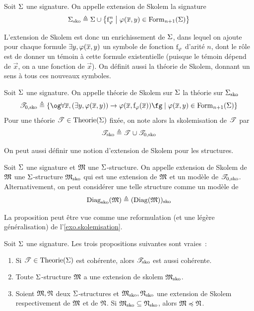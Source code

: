 \begin{definition}
  Soit $\Sigma$ une signature. On appelle extension de Skolem la signature
  \[\Sigma_{\operatorname{sko}} \triangleq
  \Sigma \cup
  \left\{ \mathrm{f}_{\varphi}^{n} \;\middle\vert\; \varphi(\overline{x},y)\in\operatorname{Form}_{n+1}(\Sigma) \right\}\]
\end{definition}

L'extension de Skolem est donc un enrichissement de $\Sigma$, dans lequel on
ajoute pour chaque formule $\exists y,\varphi(\overline{x},y)$ un symbole de fonction
$\mathrm{f}_{\varphi}$ d'arité $n$, dont le rôle est de donner un témoin à cette
formule existentielle (puisque le témoin dépend de $\vec x$, on a une fonction
de $\vec x$).
On définit aussi la théorie de Skolem, donnant un sens à tous ces
nouveaux symboles.

\begin{definition}
  Soit $\Sigma$ une signature. On appelle théorie de Skolem sur $\Sigma$ la
  théorie sur $\Sigma_{\operatorname{sko}}$
  \[\varT_{0,\sko} \defeq
  \compr{\ogM \forall \vec x,
    (\exists y, \varFF(\vec x,y))\to \varFF(\vec x,\symbF_{\varFF}(\vec x))\fgM}
        {\varFF(\vec x,y)\in\Formula_{n+1}(\Sign)}
  \]
  Pour une théorie $\mathscr T\in\operatorname{Theorie}(\Sigma)$ fixée, on note alors la
  skolemisation de $\mathscr T$ par
  \[\mathscr T_{\operatorname{sko}} \triangleq \mathscr T\cup\mathscr T_{0,\operatorname{sko}}\]
\end{definition}

On peut aussi définir une notion d'extension de Skolem pour les structures.

\begin{definition}
  Soit $\Sigma$ une signature et $\mathfrak{M}$ une $\Sigma$-structure. On appelle
  extension de Skolem de $\mathfrak{M}$ une $\Sigma$-structure $\mathfrak{M}_{\operatorname{sko}}$ qui
  est une extension de $\mathfrak{M}$ et un modèle de $\mathscr T_{0,\operatorname{sko}}$.
  Alternativement, on peut considérer une telle structure comme un modèle de
  \[\operatorname{Diag}_{\operatorname{sko}}(\mathfrak{M})\triangleq (\operatorname{Diag}(\mathfrak{M}))_{\operatorname{sko}}\]
\end{definition}

La proposition peut être vue comme une reformulation (et une légère
généralisation) de l'\cref{exo.skolemisation}.

\begin{proposition}\label{prop.skolemisation}
  Soit $\Sigma$ une signature. Les trois propositions suivantes sont vraies~:
  \begin{enumerate}[label=(\roman*)]
  \item Si $\mathscr T\in\operatorname{Theorie}(\Sigma)$ est cohérente, alors $\mathscr T_{\operatorname{sko}}$ est
    aussi cohérente.
  \item Toute $\Sigma$-structure $\mathfrak{M}$ a une extension de skolem
    $\mathfrak{M}_{\operatorname{sko}}$.
  \item Soient $\mathfrak{M},\mathfrak{N}$ deux $\Sigma$-structures et
    $\mathfrak{M}_{\operatorname{sko}},\mathfrak{N}_{\operatorname{sko}}$ une extension de Skolem respectivement de
    $\mathfrak{M}$ et de $\mathfrak{N}$. Si $\mathfrak{M}_{\operatorname{sko}}\subseteq\mathfrak{N}_{\operatorname{sko}}$, alors
    $\mathfrak{M}\preccurlyeq\mathfrak{N}$.
  \end{enumerate}
\end{proposition}


